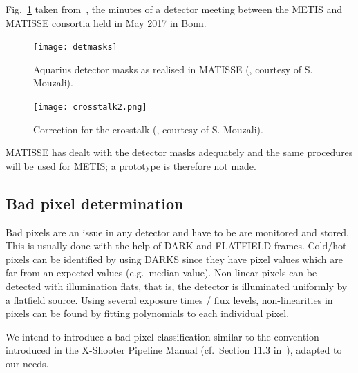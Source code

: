 Fig.~\ref{fig:detmasks} taken from~\cite{matisse_minutes}, the minutes
of a detector meeting between the METIS and MATISSE consortia held in May 2017 in Bonn.
\begin{figure}[ht]
  \centering
  \texttt{[image: detmasks]}
  \caption[Aquarius detector masks]{Aquarius detector masks as
    realised in MATISSE (\cite{matisse_minutes}, courtesy of
    S. Mouzali).}
  \label{fig:detmasks}
\end{figure}



\begin{figure}[ht]
  \centering
  \texttt{[image: crosstalk2.png]}
  \caption[Detector crosstalk correction]{Correction for the crosstalk
    (\cite{matisse_minutes}, courtesy of S. Mouzali).}
  \label{fig:crosstalk2}
\end{figure}

MATISSE has dealt with the detector masks adequately and the same procedures will be used for METIS; a prototype is therefore not made.


\subsection{Bad pixel determination}\label{ssec:criticalbadpixeldetermination}

Bad pixels are an issue in any detector and have to be are monitored and stored.
This is usually done with the help of DARK and FLATFIELD frames.
Cold/hot pixels can be identified by using DARKS since they have pixel values which are far from an expected values (e.g.\ median value).
Non-linear pixels can be detected with illumination flats, that is, the detector is illuminated uniformly by a flatfield source.
Using  several exposure times / flux levels, non-linearities in pixels can be found by fitting polynomials to each  individual pixel.

We intend to introduce a bad pixel classification similar to the convention introduced in the X-Shooter Pipeline Manual (cf.\ Section 11.3 in~\cite{xshooter_manual}), adapted to our needs.

